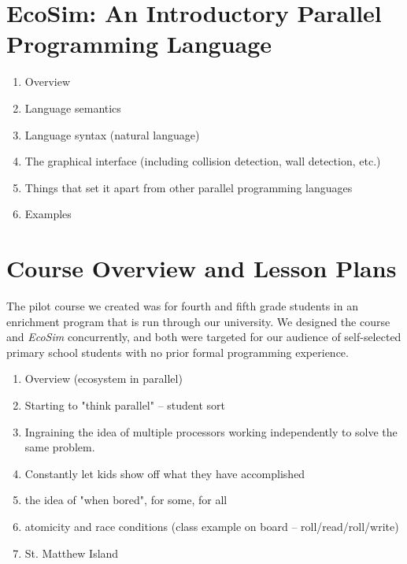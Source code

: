 \documentclass{sig-alternate}
\begin{document}
\section{EcoSim: An Introductory Parallel Programming Language}
\begin{enumerate}
\item Overview
\item Language semantics
\item Language syntax (natural language)
\item The graphical interface (including collision detection, wall detection, etc.)
\item Things that set it apart from other parallel programming languages
\item Examples
\end{enumerate}

\section{Course Overview and Lesson Plans}
The pilot course we created was for fourth and fifth grade students in an enrichment program
that is run through our university.  We designed the course and \emph{EcoSim} concurrently,
and both were targeted for our audience of self-selected primary school students with no
prior formal programming experience.
\begin{enumerate}
\item Overview (ecosystem in parallel)
\item Starting to "think parallel" -- student sort
\item Ingraining the idea of multiple processors working independently to solve the same problem.
\item Constantly let kids show off what they have accomplished
\item the idea of "when bored", for some, for all
\item atomicity and race conditions (class example on board -- roll/read/roll/write)
\item St. Matthew Island
\end{enumerate}
\end{document}
